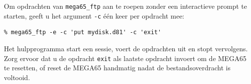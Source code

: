 Om opdrachten van {\tt mega65\_ftp} aan te roepen zonder een interactieve prompt te starten, geeft u het argument {\tt -c} één keer per opdracht mee:

\begin{verbatim}
% mega65_ftp -e -c 'put mydisk.d81' -c 'exit'
\end{verbatim}

Het hulpprogramma start een sessie, voert de opdrachten uit en stopt vervolgens. Zorg ervoor dat u de opdracht {\tt exit} als laatste opdracht invoert om de MEGA65 te resetten, of reset de MEGA65 handmatig nadat de bestandsoverdracht is voltooid.